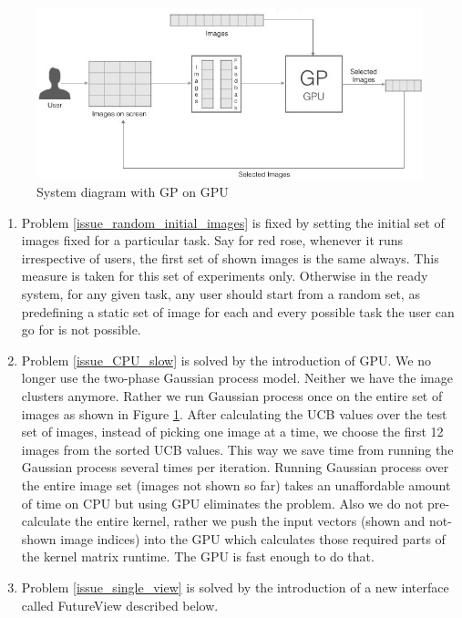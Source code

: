\documentclass[english]{tktltiki}
\begin{document}
\begin{figure}[h!]
  \centering
    \includegraphics[width=1.0\textwidth]{figures/Imse_System_Diagram_2}
    \caption{System diagram with GP on GPU}
    \label{system_diagram_2}
\end{figure}

\begin{enumerate}
	\item Problem \ref{issue_random_initial_images} is fixed by setting the initial set of images fixed for a particular task. Say for red rose, whenever it runs irrespective of users, the first set of shown images is the same always. This measure is taken for this set of experiments only. Otherwise in the ready system, for any given task, any user should start from a random set, as predefining a static set of image for each and every possible task the user can go for is not possible.
	\item Problem \ref{issue_CPU_slow} is solved by the introduction of GPU. We no longer use the two-phase Gaussian process model. Neither we have the image clusters anymore. Rather we run Gaussian process once on the entire set of images as shown in Figure \ref{system_diagram_2}. After calculating the UCB values over the test set of images, instead of picking one image at a time, we choose the first 12 images from the sorted UCB values. This way we save time from running the Gaussian process several times per iteration. Running Gaussian process over the entire image set (images not shown so far) takes an unaffordable amount of time on CPU but using GPU eliminates the problem. Also we do not pre-calculate the entire kernel, rather we push the input vectors (shown and not-shown image indices) into the GPU which calculates those required parts of the kernel matrix runtime. The GPU is fast enough to do that.
	\item Problem \ref{issue_single_view} is solved by the introduction of a new interface called FutureView described below.
 
\end{enumerate}
\end{document}

